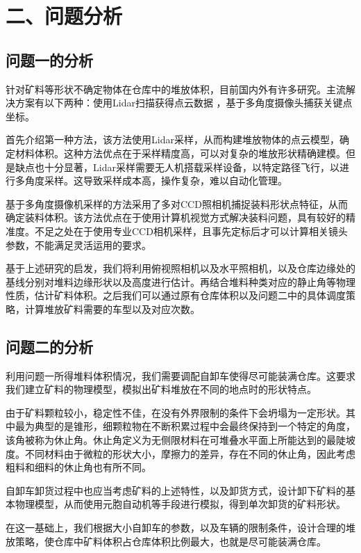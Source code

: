\documentclass{my_paper}
\begin{document}
\section{二、问题分析}
\subsection{问题一的分析}

针对矿料等形状不确定物体在仓库中的堆放体积，目前国内外有许多研究。主流解决方案有以下两种：使用Lidar扫描获得点云数据\cite{UAV} ，基于多角度摄像头捕获关键点坐标\cite{camera}。

首先介绍第一种方法，该方法使用Lidar采样，从而构建堆放物体的点云模型，确定材料体积。这种方法优点在于采样精度高，可以对复杂的堆放形状精确建模。但是缺点也十分显著，Lidar采样需要无人机搭载采样设备，以特定路径飞行，以进行多角度采样。这导致采样成本高，操作复杂，难以自动化管理。

基于多角度摄像机采样的方法采用了多对CCD照相机捕捉装料形状点特征，从而确定装料体积。该方法优点在于使用计算机视觉方式解决装料问题，具有较好的精准度。不足之处在于使用专业CCD相机采样，且事先定标后才可以计算相关镜头参数，不能满足灵活运用的要求。

基于上述研究的启发，我们将利用俯视照相机以及水平照相机，以及仓库边缘处的基线分别对堆料边缘形状以及高度进行估计。再结合堆料种类对应的静止角等物理性质，估计矿料体积。之后我们可以通过原有仓库体积以及问题二中的具体调度策略，计算堆放矿料需要的车型以及对应次数。

\subsection{问题二的分析}
利用问题一所得堆料体积情况，我们需要调配自卸车使得尽可能装满仓库。这要求我们建立矿料的物理模型，模拟出矿料堆放在不同的地点时的形状特点。

由于矿料颗粒较小，稳定性不佳，在没有外界限制的条件下会坍塌为一定形状。其中最为典型的是锥形，细颗粒物在不断积累过程中会最终保持到一个特定的角度，该角被称为休止角。休止角定义为无侧限材料在可堆叠水平面上所能达到的最陡坡度。\cite{angle}不同材料由于微粒的形状大小，摩擦力的差异，存在不同的休止角，因此考虑粗料和细料的休止角也有所不同。

自卸车卸货过程中也应当考虑矿料的上述特性，以及卸货方式，设计卸下矿料的基本物理模型，从而使用元胞自动机等手段进行模拟，得到单次卸货的矿料形状。

在这一基础上，我们根据大小自卸车的参数，以及车辆的限制条件，设计合理的堆放策略，使仓库中矿料体积占仓库体积比例最大，也就是尽可能装满仓库。
\end{document}
